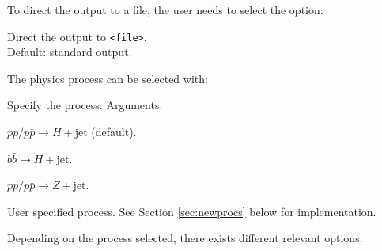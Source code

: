 \documentclass[12pt]{article}
\begin{document}
\noindent
To direct the output to a file, the user needs to select the option: 
\begin{description}[labelindent=\parindent, labelwidth =\widthof{\bfseries9999999999999999999999}, leftmargin = !] 
	\item[\texttt{-o, --out <file>}] Direct the output to \texttt{<file>}.\\ Default: standard output.
\end{description}
The physics process can be selected with: 
\begin{description}[labelindent=\parindent, labelwidth =\widthof{\bfseries9999999999999999999999}, leftmargin = !] 
	\item[\texttt{--proc <arg>}] Specify the process. Arguments: \vspace{-2mm} 
	\begin{description}[labelwidth =\widthof{\bfseries99999}, leftmargin = !] 
		\item[\texttt{H}] $pp/p\bar{p} \rightarrow H + \text{jet}$ (default). 
		\item[\texttt{bbH}] $b\bar{b} \rightarrow H + \text{jet}$. 
		\item[\texttt{Z}] $pp/p\bar{p} \rightarrow Z + \text{jet}$. 
		\item[\texttt{user}] User specified process. See Section \ref{sec:newprocs} below for implementation. 
	\end{description}
\end{description}
Depending on the process selected, there exists different relevant options. 
\end{document}
